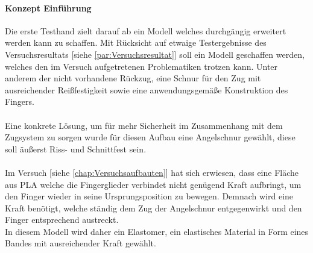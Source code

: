 \documentclass[titlepage,12pt,twoside]{article}
\begin{document}
\paragraph{Konzept Einführung}
\hfill \break
\hfill \break
Die erste Testhand zielt darauf ab ein Modell welches durchgängig erweitert 
werden kann zu schaffen. Mit Rücksicht auf etwaige Testergebnisse des 
Versuchsresultats [siehe \textcolor{blue}{\autoref{par:Versuchsresultat}}] soll ein Modell geschaffen werden, 
welches den im Versuch aufgetretenen Problematiken trotzen kann. Unter anderem 
der nicht vorhandene Rückzug, eine Schnur für den Zug mit ausreichender 
Reißfestigkeit sowie eine anwendungsgemäße Konstruktion des Fingers. \\
\\
Eine konkrete Lösung, um für mehr Sicherheit im Zusammenhang mit dem Zugsystem 
zu sorgen wurde für diesen Aufbau eine Angelschnur gewählt, diese soll äußerst Riss- und Schnittfest sein. \\
\\
Im Versuch [siehe \textcolor{blue}{\autoref{chap:Versuchsaufbauten}}] hat sich erwiesen, dass eine Fläche aus PLA welche die 
Fingerglieder verbindet nicht genügend Kraft aufbringt, um den Finger wieder in 
seine Ursprungsposition zu bewegen. Demnach wird eine Kraft benötigt, welche 
ständig dem Zug der Angelschnur entgegenwirkt und den Finger entsprechend 
austreckt. \\
In diesem Modell wird daher ein Elastomer, ein elastisches Material in Form 
eines Bandes mit ausreichender Kraft gewählt. \\
\end{document}
